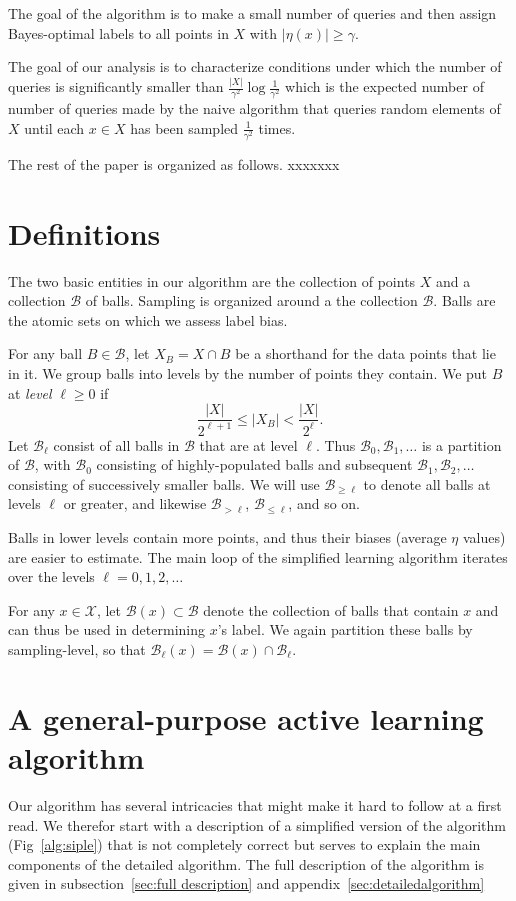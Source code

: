 \documentclass[twoside]{article}
\def\X{{\mathcal X}}
\def\B{{\mathcal B}}
\begin{document}
The goal of the algorithm is to make a small number of queries and then
assign Bayes-optimal labels to all points in $X$ with $|\eta(x)| \geq \gamma$.

The goal of our analysis is to characterize conditions under which the
number of queries is significantly smaller than
$\frac{|X|}{\gamma^2}\log \frac{1}{\gamma^2}$ which is the expected
  number of number of queries made by the naive algorithm that queries
  random elements of $X$ until each $x \in X$ has been sampled
  $\frac{1}{\gamma^2}$ times.

The rest of the paper is organized as follows. xxxxxxx

\section{Definitions}

The two basic entities in our algorithm are the collection of points
$X$ and a collection $\B$ of balls. Sampling is organized around a the
collection $\B$. Balls are the atomic sets on which we assess label
bias.

For any ball $B \in \B$, let $X_B = X \cap B$ be a shorthand for the
data points that lie in it.  We group balls into levels by the number
of points they contain. We put $B$ at {\it level} $\ell \geq 0$ if
\begin{equation}
\frac{|X|}{2^{\ell + 1}} \leq |X_B| < \frac{|X|}{2^\ell} .
\label{eq:sampling-level}
\end{equation}
Let $\B_\ell$ consist of all balls in $\B$ that are at level
$\ell$. Thus $\B_0, \B_1, \ldots$ is a partition of $\B$, with $\B_0$
consisting of highly-populated balls and subsequent
$\B_1, \B_2, \ldots$ consisting of successively smaller balls. We will
use $\B_{\geq \ell}$ to denote all balls at levels $\ell$ or greater,
and likewise $\B_{> \ell}$, $\B_{\leq \ell}$, and so on.

Balls in lower levels contain more points, and thus their biases
(average $\eta$ values) are easier to estimate. The main loop of the
simplified learning algorithm iterates over the levels $\ell=0,1,2,\ldots$

For any $x \in \X$, let $\B(x) \subset \B$ denote the collection of
balls that contain $x$ and can thus be used in determining $x$'s
label. We again partition these balls by sampling-level, so that
$\B_\ell(x) = \B(x) \cap \B_\ell$.

\section{A general-purpose active learning algorithm}
Our algorithm has several intricacies that might make it hard to
follow at a first read.  We therefor start with a description of a
simplified version of the algorithm (Fig~\ref{alg:siple}) that is not
completely correct but serves to explain the main components of the
detailed algorithm. The full description of the algorithm is given in
subsection~\ref{sec:full description} and appendix~\ref{sec:detailedalgorithm}
\end{document}
